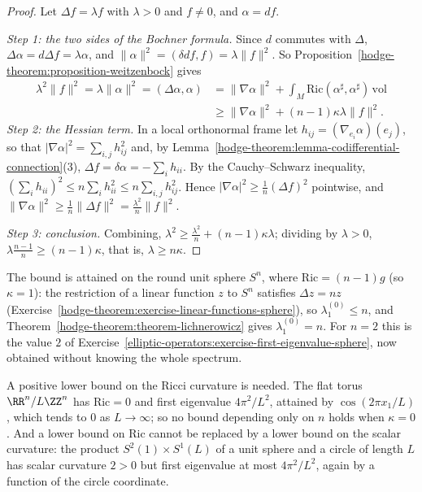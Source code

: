 \begin{proof}
Let $\Delta f = \lambda f$ with $\lambda > 0$ and $f \neq 0$, and $\alpha = df$.

\emph{Step 1: the two sides of the Bochner formula.} Since $d$ commutes with $\Delta$, $\Delta\alpha = d\Delta f = \lambda\alpha$, and $\|\alpha\|^2 = (\delta df, f) = \lambda\|f\|^2$. So
Proposition~\ref{hodge-theorem:proposition-weitzenbock} gives
\[\begin{aligned}
\lambda^2\|f\|^2 = \lambda\|\alpha\|^2 = (\Delta\alpha, \alpha) &= \|\nabla\alpha\|^2 + \int_M\mathrm{Ric}(\alpha^\sharp, \alpha^\sharp)\,\mathrm{vol}\\
&\geq \|\nabla\alpha\|^2 + (n - 1)\kappa\lambda\|f\|^2 .
\end{aligned}\]
\emph{Step 2: the Hessian term.} In a local orthonormal frame let $h_{ij} = (\nabla_{e_i}\alpha)(e_j)$, so that $|\nabla\alpha|^2 = \sum_{i,j}h_{ij}^2$ and, by Lemma~\ref{hodge-theorem:lemma-codifferential-connection}(3),
$\Delta f = \delta\alpha = -\sum_ih_{ii}$. By the Cauchy--Schwarz inequality, $(\sum_ih_{ii})^2 \leq n\sum_ih_{ii}^2 \leq n\sum_{i,j}h_{ij}^2$. Hence $|\nabla\alpha|^2 \geq \frac1n(\Delta f)^2$ pointwise, and
$\|\nabla\alpha\|^2 \geq \frac1n\|\Delta f\|^2 = \frac{\lambda^2}{n}\|f\|^2$.

\emph{Step 3: conclusion.} Combining, $\lambda^2 \geq \frac{\lambda^2}{n} + (n - 1)\kappa\lambda$; dividing by $\lambda > 0$, $\lambda\frac{n - 1}{n} \geq (n - 1)\kappa$, that is, $\lambda \geq n\kappa$.
\end{proof}

\begin{example}\label{hodge-theorem:example-lichnerowicz-sphere}
The bound is attained on the round unit sphere $S^n$, where $\mathrm{Ric} = (n - 1)g$ (so $\kappa = 1$): the restriction of a linear function $z$ to $S^n$ satisfies $\Delta z = nz$
(Exercise~\ref{hodge-theorem:exercise-linear-functions-sphere}), so $\lambda_1^{(0)} \leq n$, and Theorem~\ref{hodge-theorem:theorem-lichnerowicz} gives $\lambda_1^{(0)} = n$. For $n = 2$ this is the value $2$ of
Exercise~\ref{elliptic-operators:exercise-first-eigenvalue-sphere}, now obtained without knowing the whole spectrum.
\end{example}

\begin{counterexample}\label{hodge-theorem:counterexample-lichnerowicz}
A positive lower bound on the Ricci curvature is needed. The flat torus $\RR^n/L\ZZ^n$ has $\mathrm{Ric} = 0$ and first eigenvalue $4\pi^2/L^2$, attained by $\cos(2\pi x_1/L)$, which tends to $0$ as $L \to \infty$; so no
bound depending only on $n$ holds when $\kappa = 0$. And a lower bound on $\mathrm{Ric}$ cannot be replaced by a lower bound on the scalar curvature: the product $S^2(1) \times S^1(L)$ of a unit sphere and a circle of
length $L$ has scalar curvature $2 > 0$ but first eigenvalue at most $4\pi^2/L^2$, again by a function of the circle coordinate.
\end{counterexample}

